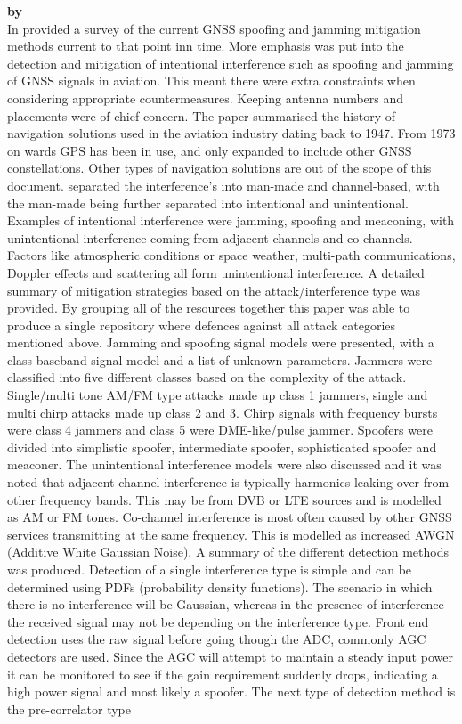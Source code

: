 \textbf{\emph{} by \citeauthor{RN34}} \\
In \citeyear{RN34} \citeauthor{RN34} \cite{RN34} provided a survey of the current GNSS spoofing and jamming mitigation methods current to that point inn time. More
emphasis was put into the detection and mitigation of intentional interference such as spoofing and jamming of GNSS signals in aviation. This meant there were extra
constraints when considering appropriate countermeasures. Keeping antenna numbers and placements were of chief concern. The paper summarised the history of navigation
solutions used in the aviation industry dating back to 1947. From 1973 on wards GPS has been in use, and only expanded to include other GNSS constellations. Other types
of navigation solutions are out of the scope of this document.
\citeauthor{RN34} separated the interference's into man-made and channel-based, with the man-made being further separated into intentional and unintentional. Examples of
intentional interference were jamming, spoofing and meaconing, with unintentional interference coming from adjacent channels and co-channels. Factors like atmospheric
conditions or space weather, multi-path communications, Doppler effects and scattering all form unintentional interference. A detailed summary of mitigation strategies
based on the attack/interference type was provided. By grouping all of the resources together this paper was able to produce a single repository where defences against
all attack categories mentioned above. Jamming and spoofing signal models were presented, with a class baseband signal model and a list of unknown parameters. Jammers
were classified into five different classes based on the complexity of the attack. Single/multi tone AM/FM type attacks made up class 1 jammers, single and multi chirp
attacks made up class 2 and 3. Chirp signals with frequency bursts were class 4 jammers and class 5 were DME-like/pulse jammer. Spoofers were divided into simplistic
spoofer, intermediate spoofer, sophisticated spoofer and meaconer. The unintentional interference models were also discussed and it was noted that adjacent channel
interference is typically harmonics leaking over from other frequency bands. This may be from DVB or LTE sources and is modelled as AM or FM tones. Co-channel
interference is most often caused by other GNSS services transmitting at the same frequency. This is modelled as increased AWGN (Additive White Gaussian Noise). A summary
of the different detection methods was produced. Detection of a single interference type is simple and can be determined using PDFs (probability density functions). The
scenario in which there is no interference will be Gaussian, whereas in the presence of interference the received signal may not be depending on the interference type.
Front end detection uses the raw signal before going though the ADC, commonly AGC detectors are used. Since the AGC will attempt to maintain a steady input power it can
be monitored to see if the gain requirement suddenly drops, indicating a high power signal and most likely a spoofer. The next type of detection method is the
pre-correlator type 


